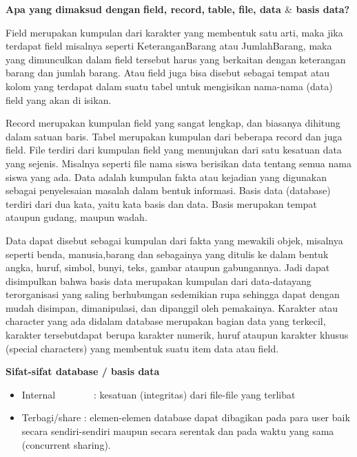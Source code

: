 \noindent 
\textbf{Apa yang dimaksud dengan}\textbf{ field, record, }\textbf{table, file, data  $  \&  $ basis data?} \par
Field merupakan kumpulan dari karakter yang membentuk satu arti, maka jika terdapat field misalnya seperti KeteranganBarang atau JumlahBarang, maka yang dimunculkan dalam field tersebut harus yang berkaitan dengan keterangan barang dan jumlah barang. Atau field juga bisa disebut sebagai tempat atau kolom yang terdapat dalam suatu tabel untuk mengisikan nama-nama (data) field yang akan di isikan. \par
\vspace{12pt}
Record merupakan kumpulan field yang sangat lengkap, dan biasanya dihitung dalam satuan baris. Tabel merupakan kumpulan dari beberapa record dan juga field. File terdiri dari kumpulan field yang menunjukan dari satu kesatuan data yang sejenis. Misalnya seperti file nama siswa berisikan data tentang semua nama siswa yang ada. Data adalah kumpulan fakta atau kejadian yang digunakan sebagai penyelesaian masalah dalam bentuk informasi. Basis data (database) terdiri dari dua kata, yaitu kata basis dan data. Basis merupakan tempat ataupun gudang, maupun wadah. \par
Data dapat disebut sebagai kumpulan dari fakta yang mewakili objek, misalnya seperti benda, manusia,barang dan sebagainya yang ditulis ke dalam bentuk angka, huruf, simbol, bunyi, teks, gambar ataupun gabungannya. Jadi dapat disimpulkan bahwa basis data merupakan kumpulan dari data-datayang terorganisasi yang saling berhubungan sedemikian rupa sehingga dapat dengan mudah disimpan, dimanipulasi, dan dipanggil oleh pemakainya. Karakter atau character yang ada didalam database merupakan bagian data yang terkecil, karakter tersebutdapat berupa karakter numerik, huruf ataupun karakter khusus (special characters) yang membentuk suatu item data atau field. \par
\vspace{12pt}
\noindent 
\textbf{Sifat-sifat database / basis data} \par
\noindent 
\begin{itemize}
\item Internal~~~~~~~~:  kesatuan (integritas) dari file-file yang terlibat \par
\noindent 
\item Terbagi/share : elemen-elemen database dapat dibagikan pada para user baik secara sendiri-sendiri maupun secara serentak dan pada waktu yang sama (concurrent sharing).\end{itemize}
